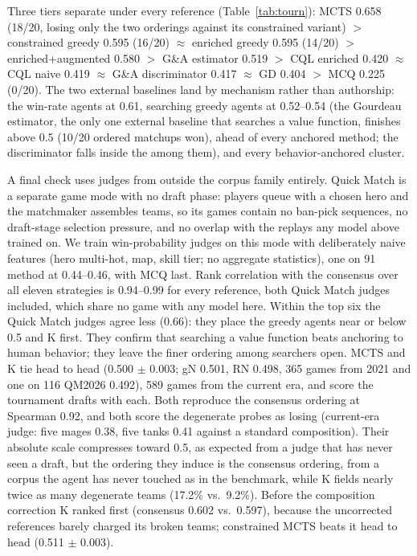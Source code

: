 \documentclass[journal]{IEEEtran}
\providecommand{\DIFaddtex}[1]{{\protect\color{blue} \sf #1}} %
\providecommand{\DIFdeltex}[1]{{\protect\color{red} \scriptsize #1}} %
\providecommand{\DIFaddbegin}{} %
\providecommand{\DIFaddend}{} %
\providecommand{\DIFdelbegin}{} %
\providecommand{\DIFdelend}{} %
\providecommand{\DIFadd}[1]{\texorpdfstring{\DIFaddtex{#1}}{#1}} %
\providecommand{\DIFdel}[1]{\texorpdfstring{\DIFdeltex{#1}}{}} %
\begin{document}
\DIFadd{Three tiers separate under every reference (Table~\ref{tab:tourn}): }\DIFaddend MCTS \DIFdelbegin \DIFdel{0.658 (18/20, losing only the two orderings against its constrained variant) $>$ constrained greedy 0.595 (16/20) $\approx$ enriched greedy 0.595 (14/20) $>$ enriched+augmented 0.580 $>$ G\&A estimator 0.519 $>$ CQL enriched 0.420 $\approx$ CQL naive 0.419 $\approx$ G\&A discriminator 0.417 $\approx$ GD 0.404 $>$ MCQ 0.225 (0/20). The two external baselines land by mechanism rather than authorship: the win-rate }\DIFdelend \DIFaddbegin \DIFadd{agents at 0.61, searching greedy agents at 0.52--0.54 (the Gourdeau }\DIFaddend estimator, the \DIFdelbegin \DIFdel{only }\DIFdelend \DIFaddbegin \DIFadd{one external }\DIFaddend baseline that searches a value function, \DIFdelbegin \DIFdel{finishes above 0.5 (10/20 ordered matchups won), ahead of every anchored method; the discriminator falls inside the }\DIFdelend \DIFaddbegin \DIFadd{among them), and every }\DIFaddend behavior-anchored \DIFdelbegin \DIFdel{cluster. }%

\DIFdel{A final check uses judges from outside the corpus family entirely. Quick Match is a separate game mode with no draft phase: players queue with a chosen hero and the matchmaker assembles teams, so its games contain no ban-pick sequences, no draft-stage selection pressure, and no overlap with the replays any model above trained on. We train win-probability judges on this mode with deliberately naive features (hero multi-hot, map, skill tier; no aggregate statistics), one on 91}%
\DIFdelend \DIFaddbegin \DIFadd{method at 0.44--0.46, with MCQ last. Rank correlation with the consensus over all eleven strategies is 0.94--0.99 for every reference, both Quick Match judges included, which share no game with any model here. Within the top six the Quick Match judges agree less (0.66): they place the greedy agents near or below 0.5 and K first. They confirm that searching a value function beats anchoring to human behavior; they leave the finer ordering among searchers open. MCTS and K tie head to head (0.500 $\pm$ 0.003; gN 0.501, RN 0.498}\DIFaddend , \DIFdelbegin %
\DIFdel{365 games from 2021 and one on 116}%
\DIFdelend \DIFaddbegin \DIFadd{QM2026 0.492)}\DIFaddend , \DIFdelbegin %
\DIFdel{589 games from the current era, and score the tournament drafts with each. Both reproduce the consensus ordering at Spearman 0.92, and both score the degenerate probes as losing (current-era judge: five mages 0.38, five tanks 0.41 against a standard composition). Their absolute scale compresses toward 0.5, as expected from a judge that has never seen a draft, but the ordering they induce is the consensus ordering, from a corpus the agent has never touched}\DIFdelend \DIFaddbegin \DIFadd{as in the benchmark, while K fields nearly twice as many degenerate teams (17.2\% vs.\ 9.2\%). Before the composition correction K ranked first (consensus 0.602 vs.\ 0.597), because the uncorrected references barely charged its broken teams; constrained MCTS beats it head to head (0.511 $\pm$ 0.003)}\DIFaddend .
\end{document}
